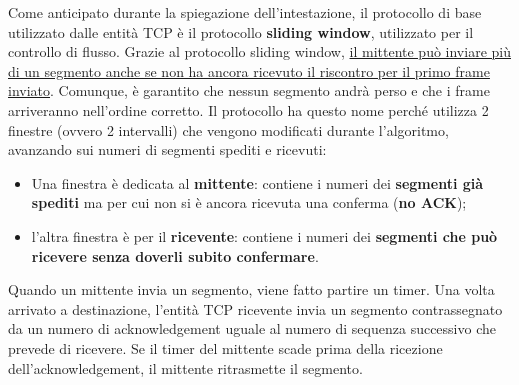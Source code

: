         Come anticipato durante la spiegazione dell’intestazione, il protocollo di base utilizzato dalle
        entità TCP è il protocollo \textbf{sliding window}, utilizzato per il controllo di flusso. Grazie al
        protocollo sliding window, \underline{il mittente può inviare più di un segmento anche se non ha ancora
        ricevuto il riscontro per il primo frame inviato}. Comunque, è garantito che nessun segmento
        andrà perso e che i frame arriveranno nell’ordine corretto. Il protocollo ha questo nome
        perché utilizza 2 finestre (ovvero 2 intervalli) che vengono modificati durante l’algoritmo,
        avanzando sui numeri di segmenti spediti e ricevuti:
        \begin{itemize}
            \item Una finestra è dedicata al \textbf{mittente}: contiene i numeri dei \textbf{segmenti già spediti} ma per
            cui non si è ancora ricevuta una conferma (\textbf{no ACK});
            \item l’altra finestra è per il \textbf{ricevente}: contiene i numeri dei \textbf{segmenti che può ricevere
        senza doverli subito confermare}.
        \end{itemize}
        Quando un mittente invia un segmento, viene fatto partire un timer. Una volta arrivato a
        destinazione, l’entità TCP ricevente invia un segmento contrassegnato da un numero di
        acknowledgement uguale al numero di sequenza successivo che prevede di ricevere. Se il timer
        del mittente scade prima della ricezione dell’acknowledgement, il mittente ritrasmette il
        segmento.\\


